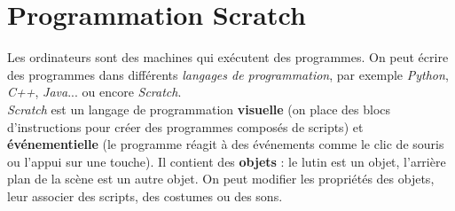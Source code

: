 \chapter{Programmation Scratch}\label{ficheScratch1}  

Les ordinateurs sont des machines qui exécutent des programmes. On peut écrire des programmes dans différents \emph{langages de programmation}, par exemple \emph{Python}, \emph{C++}, \emph{Java}... ou encore \emph{Scratch}.\\

\emph{Scratch} est un langage de programmation \textbf{visuelle} (on place des blocs d'instructions pour créer des programmes composés de scripts) et \textbf{événementielle} (le programme réagit à des événements comme le clic de souris ou l'appui sur une touche). Il contient des \textbf{objets} : le lutin est un objet, l'arrière plan de la scène est un autre objet. On peut modifier les propriétés des objets, leur associer des scripts, des costumes ou des sons.   \\


